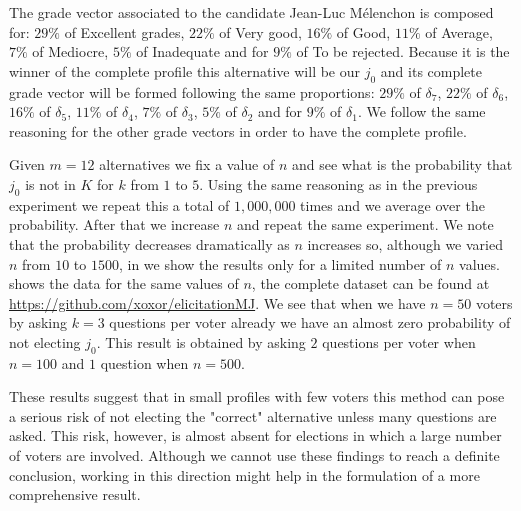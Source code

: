 	The grade vector associated to the candidate Jean-Luc Mélenchon is composed for: $29\%$ of Excellent grades, $22\%$ of Very good, $16\%$ of Good, $11\%$ of Average, $7\%$ of Mediocre, $5\%$ of Inadequate and for $9\%$ of To be rejected.
	Because it is the winner of the complete profile this alternative will be our $j_0$ and its complete grade vector will be formed following the same proportions: $29\%$ of $\delta_7$, $22\%$ of $\delta_6$, $16\%$ of $\delta_5$, $11\%$ of $\delta_4$, $7\%$ of $\delta_3$, $5\%$ of $\delta_2$ and for $9\%$ of $\delta_1$.
	We follow the same reasoning for the other grade vectors in order to have the complete profile.
	
	Given $m=12$ alternatives we fix a value of $n$ and see what is the probability that $j_0$ is not in $K$ for $k$ from $1$ to $5$. Using the same reasoning as in the previous experiment we repeat this a total of $1,000,000$ times and we average over the probability. After that we increase $n$ and repeat the same experiment. We note that the probability decreases dramatically as $n$ increases so, although we varied $n$ from $10$ to $1500$, in  we show the results only for a limited number of $n$ values.
	 shows the data for the same values of $n$, the complete dataset can be found at \url{https://github.com/xoxor/elicitationMJ}. We see that when we have $n=50$ voters by asking $k=3$ questions per voter already we have an almost zero probability of not electing $j_0$. This result is obtained by asking $2$ questions per voter when $n=100$ and $1$ question when $n=500$.
	
	These results suggest that in small profiles with few voters this method can pose a serious risk of not electing the "correct" alternative unless many questions are asked. This risk, however, is almost absent for elections in which a large number of voters are involved. Although we cannot use these findings to reach a definite conclusion, working in this direction might help in the formulation of a more comprehensive result.
	

